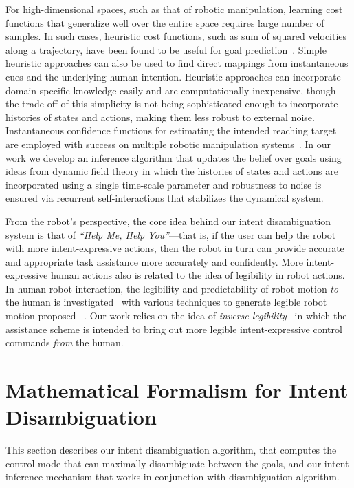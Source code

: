 \documentclass[journal]{IEEEtran}
\begin{document}
For high-dimensional spaces, such as that of robotic manipulation, learning cost functions that generalize well over the entire space requires large number of samples. In such cases, heuristic cost functions, such as sum of squared velocities along a trajectory, have been found to be useful for goal prediction~\cite{dragan2013policy}. Simple heuristic approaches can also be used to find direct mappings from instantaneous cues and the underlying human intention. Heuristic approaches can incorporate domain-specific knowledge easily and are computationally inexpensive, though the trade-off of this simplicity is not being sophisticated enough to incorporate histories of states and actions, making them less robust to external noise. Instantaneous confidence functions for estimating the intended reaching target are employed with success on multiple robotic manipulation systems~\cite{abbott2007haptic, gopinath2017human}. In our work we develop an inference algorithm that updates the belief over goals using ideas from dynamic field theory in which the histories of states and actions are incorporated using a single time-scale parameter and robustness to noise is ensured via recurrent self-interactions that stabilizes the dynamical system. 

From the robot's perspective, the core idea behind our intent disambiguation system is that of \textit{``Help Me, Help You''}---that is, if the user can help the robot with more intent-expressive actions, then the robot in turn can provide accurate and appropriate task assistance more accurately and confidently. More intent-expressive human actions also is related to the idea of legibility in robot actions. In human-robot interaction, the legibility and predictability of robot motion \textit{to} the human is investigated~\cite{dragan2013legibility} with various techniques to generate legible robot motion proposed ~\cite{holladay2014legible}. Our work relies on the idea of \textit{inverse legibility}~\cite{gopinath2017mode} in which the assistance scheme is intended to bring out more legible intent-expressive control commands \textit{from} the human. 


\section{Mathematical Formalism for Intent Disambiguation}\label{sec:ma}
This section describes our intent disambiguation algorithm, that computes the control mode that can maximally disambiguate between the goals, and our intent inference mechanism that works in conjunction with disambiguation algorithm. 
\end{document}
